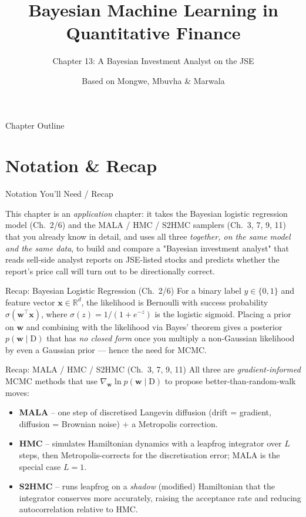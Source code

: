 \documentclass[aspectratio=169,10pt]{beamer}
\title[Bayesian ML in QF -- Ch.13]{Bayesian Machine Learning in Quantitative Finance}
\subtitle{Chapter 13: A Bayesian Investment Analyst on the JSE}
\author{Based on Mongwe, Mbuvha \& Marwala}
\date{}
\newcommand{\R}{\mathbb{R}}
\newcommand{\w}{\mathbf{w}}
\newcommand{\x}{\mathbf{x}}
\newcommand{\Data}{\mathrm{D}}
\newcommand{\sig}{\sigma}
\begin{document}
\begin{frame}
  \titlepage
\end{frame}

\begin{frame}{Chapter Outline}
  \tableofcontents
\end{frame}

\section{Notation \& Recap}

\begin{frame}[allowframebreaks]{Notation You'll Need / Recap}

This chapter is an \emph{application} chapter: it takes the Bayesian logistic
regression model (Ch.~2/6) and the MALA / HMC / S2HMC samplers (Ch.~3, 7, 9,
11) that you already know in detail, and uses all three \emph{together, on
the same model and the same data}, to build and compare a "Bayesian
investment analyst" that reads sell-side analyst reports on JSE-listed stocks
and predicts whether the report's price call will turn out to be directionally
correct.

\begin{block}{Recap: Bayesian Logistic Regression (Ch.~2/6)}
For a binary label $y\in\{0,1\}$ and feature vector $\x\in\R^d$, the
likelihood is Bernoulli with success probability $\sig(\w^\top\x)$, where
$\sig(z)=1/(1+e^{-z})$ is the logistic sigmoid. Placing a prior on $\w$ and
combining with the likelihood via Bayes' theorem gives a posterior
$p(\w\mid \Data)$ that has \emph{no closed form} once you multiply a
non-Gaussian likelihood by even a Gaussian prior --- hence the need for MCMC.
\end{block}

\begin{block}{Recap: MALA / HMC / S2HMC (Ch.~3, 7, 9, 11)}
All three are \emph{gradient-informed} MCMC methods that use $\nabla_\w \ln
p(\w\mid\Data)$ to propose better-than-random-walk moves:
\begin{itemize}
  \item \textbf{MALA} -- one step of discretised Langevin diffusion (drift =
        gradient, diffusion = Brownian noise) + a Metropolis correction.
  \item \textbf{HMC} -- simulates Hamiltonian dynamics with a leapfrog
        integrator over $L$ steps, then Metropolis-corrects for the
        discretisation error; MALA is the special case $L=1$.
  \item \textbf{S2HMC} -- runs leapfrog on a \emph{shadow} (modified)
        Hamiltonian that the integrator conserves more accurately, raising
        the acceptance rate and reducing autocorrelation relative to HMC.
\end{itemize}
\end{block}


\end{frame}
\end{document}
